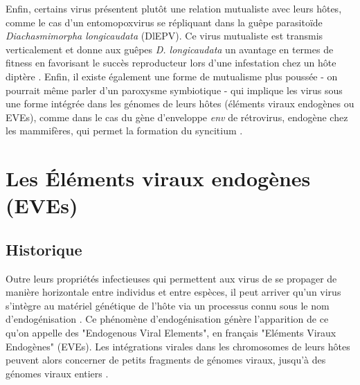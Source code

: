 Enfin, certains virus présentent plutôt une relation mutualiste avec leurs hôtes, comme le cas d'un entomopoxvirus se répliquant dans la guêpe parasitoïde \textit{Diachasmimorpha longicaudata} (DlEPV). Ce virus mutualiste est transmis verticalement et donne aux guêpes \textit{D. longicaudata} un avantage en termes de fitness en favorisant le succès reproducteur lors d'une infestation chez un hôte diptère \citep{coffman_genomic_2020}. Enfin, il existe également une forme de mutualisme plus poussée - on pourrait même parler d'un paroxysme symbiotique - qui implique les virus sous une forme intégrée dans les génomes de leurs hôtes (éléments viraux endogènes ou EVEs), comme dans le cas du gène d'enveloppe \textit{env} de rétrovirus, endogène chez les mammifères, qui permet la formation du syncitium \citep{lavialle_paleovirology_2013}.

\section{Les Éléments viraux endogènes (EVEs)}

\subsection{Historique}

Outre leurs propriétés infectieuses qui permettent aux virus de se propager de manière horizontale entre individus et entre espèces, il peut arriver qu'un virus s'intègre au matériel génétique de l'hôte via un processus connu sous le nom d'endogénisation \citep{katzourakis_endogenous_2010}. Ce phénomène d'endogénisation génère l'apparition de ce qu'on appelle des "Endogenous Viral Elements", en français "Eléments Viraux Endogènes" (EVEs). Les intégrations virales dans les chromosomes de leurs hôtes  peuvent alors concerner de petits fragments de génomes viraux, jusqu'à des génomes viraux entiers \citep{feschotte_endogenous_2012}.\\

